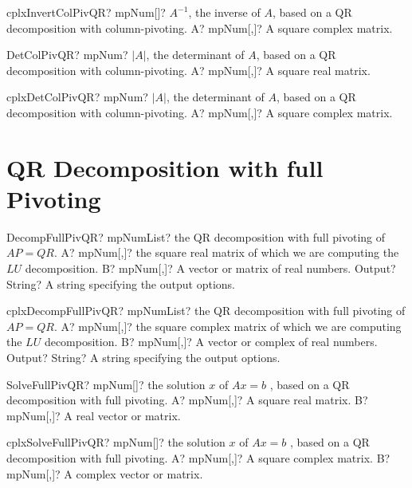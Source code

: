 \documentclass[12pt,a4paper,openany]{book}
\begin{document}
\begin{mpFunctionsExtract}
\mpFunctionOne
{cplxInvertColPivQR? mpNum[]? $A^{-1}$, the inverse of $A$, based on a QR decomposition with column-pivoting.}
{A? mpNum[,]? A square complex matrix.}
\end{mpFunctionsExtract}

\begin{mpFunctionsExtract}
\mpFunctionOne
{DetColPivQR? mpNum? $|A|$, the determinant of $A$, based on a QR decomposition with column-pivoting.}
{A? mpNum[,]? A square real matrix.}
\end{mpFunctionsExtract}

\begin{mpFunctionsExtract}
\mpFunctionOne
{cplxDetColPivQR? mpNum? $|A|$, the determinant of $A$, based on a QR decomposition with column-pivoting.}
{A? mpNum[,]? A square complex matrix.}
\end{mpFunctionsExtract}

\section{QR Decomposition with full Pivoting}

\begin{mpFunctionsExtract}
\mpFunctionThree
{DecompFullPivQR? mpNumList? the QR decomposition with full pivoting of $AP = QR$.}
{A? mpNum[,]? the square real matrix of which we are computing the $LU$ decomposition.}
{B? mpNum[,]? A vector or matrix of real numbers.}
{Output? String? A string specifying the output options.}
\end{mpFunctionsExtract}

\begin{mpFunctionsExtract}
\mpFunctionThree
{cplxDecompFullPivQR? mpNumList? the QR decomposition with full pivoting of $AP = QR$.}
{A? mpNum[,]? the square complex matrix of which we are computing the $LU$ decomposition.}
{B? mpNum[,]? A vector or complex of real numbers.}
{Output? String? A string specifying the output options.}
\end{mpFunctionsExtract}

\begin{mpFunctionsExtract}
\mpFunctionTwo
{SolveFullPivQR? mpNum[]? the solution $x$ of $A x = b$ , based on a QR decomposition with full pivoting.}
{A? mpNum[,]? A square real matrix.}
{B? mpNum[,]? A real vector or matrix.}
\end{mpFunctionsExtract}

\begin{mpFunctionsExtract}
\mpFunctionTwo
{cplxSolveFullPivQR? mpNum[]? the solution $x$ of $A x = b$ , based on a QR decomposition with full pivoting.}
{A? mpNum[,]? A square complex matrix.}
{B? mpNum[,]? A complex vector or matrix.}
\end{mpFunctionsExtract}
\end{document}
